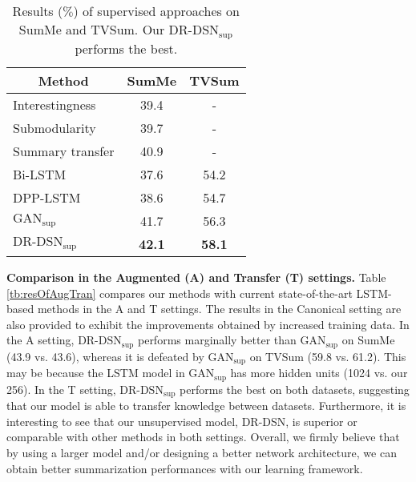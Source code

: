 \documentclass[letterpaper]{article} \usepackage{aaai18}  \usepackage{times}  \usepackage{helvet}  \usepackage{courier}  \usepackage{url}  \usepackage{graphicx}
\begin{document}
\begin{table}[h]
\centering
\caption{Results ($\%$) of supervised approaches on SumMe and TVSum. Our $\text{DR-DSN}_\text{sup}$ performs the best.}
\label{tb:resOfSup}
\begin{tabular}{l | c | c}
\hline
\multicolumn{1}{c|}{Method} & SumMe & TVSum \\
\hline
Interestingness & 39.4 & - \\
Submodularity & 39.7 & - \\
Summary transfer & 40.9 & - \\
Bi-LSTM & 37.6 & 54.2 \\
DPP-LSTM & 38.6 & 54.7 \\
$\text{GAN}_\text{sup}$ & 41.7 & 56.3 \\
\hline \hline
$\text{DR-DSN}_\text{sup}$ & {\bf 42.1} & {\bf 58.1} \\
\hline
\end{tabular}
\end{table}

{\bf Comparison in the Augmented (A) and Transfer (T) settings.} Table \ref{tb:resOfAugTran} compares our methods with current state-of-the-art LSTM-based methods in the A and T settings. The results in the Canonical setting are also provided to exhibit the improvements obtained by increased training data. In the A setting, $\text{DR-DSN}_\text{sup}$ performs marginally better than $\text{GAN}_\text{sup}$ on SumMe (43.9 vs. 43.6), whereas it is defeated by $\text{GAN}_\text{sup}$ on TVSum (59.8 vs. 61.2). This may be because the LSTM model in $\text{GAN}_\text{sup}$ has more hidden units (1024 vs. our 256). In the T setting, $\text{DR-DSN}_\text{sup}$ performs the best on both datasets, suggesting that our model is able to transfer knowledge between datasets. Furthermore, it is interesting to see that our unsupervised model, DR-DSN, is superior or comparable with other methods in both settings. Overall, we firmly believe that by using a larger model and/or designing a better network architecture, we can obtain better summarization performances with our learning framework.
\end{document}
